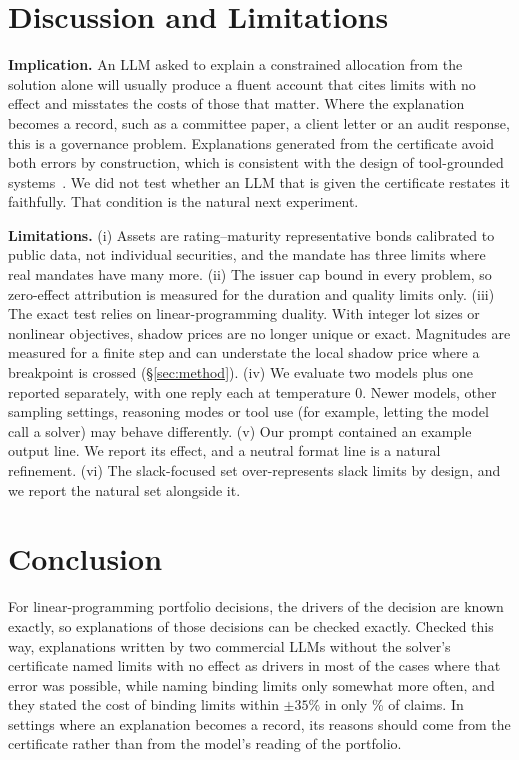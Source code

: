 \section{Discussion and Limitations}
\textbf{Implication.} An LLM asked to explain a constrained allocation from the
solution alone will usually produce a fluent account that cites limits with no
effect and misstates the costs of those that matter. Where the explanation
becomes a record, such as a committee paper, a client letter or an audit
response, this is a governance problem. Explanations generated from the
certificate avoid both errors by construction, which is consistent with the
design of tool-grounded systems~\cite{optiguide23,optichat25}. We did not test
whether an LLM that is given the certificate restates it faithfully. That
condition is the natural next experiment.

\textbf{Limitations.} (i) Assets are rating--maturity representative bonds
calibrated to public data, not individual securities, and the mandate has three
limits where real mandates have many more. (ii) The issuer cap bound in every
problem, so zero-effect attribution is measured for the duration and quality
limits only. (iii) The exact test relies on linear-programming duality. With
integer lot sizes or nonlinear objectives, shadow prices are no longer unique or
exact. Magnitudes are measured for a finite step and can understate the local
shadow price where a breakpoint is crossed (\S\ref{sec:method}). (iv) We evaluate
two models plus one reported separately, with one reply each at temperature 0.
Newer models, other sampling settings, reasoning modes or tool use (for example,
letting the model call a solver) may behave differently. (v) Our prompt contained
an example output line. We report its effect, and a neutral format line is a
natural refinement. (vi) The slack-focused set over-represents slack limits by
design, and we report the natural set alongside it.

\section{Conclusion}
For linear-programming portfolio decisions, the drivers of the decision are
known exactly, so explanations of those decisions can be checked exactly.
Checked this way, explanations written by two commercial LLMs without the
solver's certificate named limits with no effect as drivers in most of the
cases where that error was possible, while naming binding limits only somewhat
more often, and they stated the cost of binding limits within $\pm35\%$ in only
\magMain\% of claims. In settings where an explanation becomes a record, its
reasons should come from the certificate rather than from the model's reading of
the portfolio.
